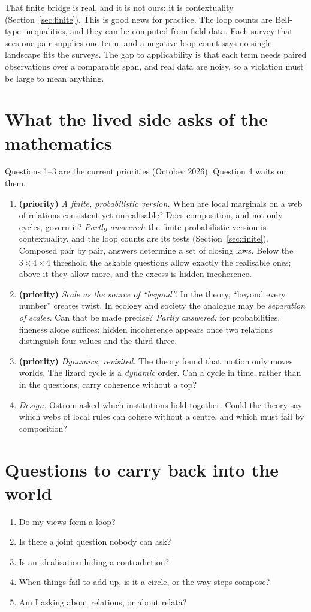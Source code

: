 \documentclass[11pt]{article}
\begin{document}
That finite bridge is real, and it is not ours: it is contextuality
(Section~\ref{sec:finite}). This is good news for practice. The loop counts are
Bell-type inequalities, and they can be computed from field data. Each survey
that sees one pair supplies one term, and a negative loop count says no single
landscape fits the surveys. The gap to applicability is that each term needs
paired observations over a comparable span, and real data are noisy, so a
violation must be large to mean anything.

\section{What the lived side asks of the mathematics}
Questions 1--3 are the current priorities (October 2026). Question 4 waits on
them.
\begin{enumerate}[nosep]
  \item \textbf{(priority)} \emph{A finite, probabilistic version.} When are local marginals on a
    web of relations consistent yet unrealisable? Does composition, and not only
    cycles, govern it? \emph{Partly answered:} the finite probabilistic version is
    contextuality, and the loop counts are its tests (Section~\ref{sec:finite}).
    Composed pair by pair, answers determine a set of closing laws. Below the
    $3\times4\times4$ threshold the askable questions allow exactly the realisable
    ones; above it they allow more, and the excess is hidden incoherence.
  \item \textbf{(priority)} \emph{Scale as the source of ``beyond''.} In the theory, ``beyond every
    number'' creates twist. In ecology and society the analogue may be
    \emph{separation of scales}. Can that be made precise? \emph{Partly answered:}
    for probabilities, fineness alone suffices: hidden incoherence appears once
    two relations distinguish four values and the third three.
  \item \textbf{(priority)} \emph{Dynamics, revisited.} The theory found that motion only moves
    worlds. The lizard cycle is a \emph{dynamic} order. Can a cycle in time,
    rather than in the questions, carry coherence without a top?
  \item \emph{Design.} Ostrom asked which institutions hold together. Could the
    theory say which webs of local rules can cohere without a centre, and which
    must fail by composition?
\end{enumerate}

\section*{Questions to carry back into the world}
\begin{enumerate}[nosep]
  \item Do my views form a loop?
  \item Is there a joint question nobody can ask?
  \item Is an idealisation hiding a contradiction?
  \item When things fail to add up, is it a circle, or the way steps compose?
  \item Am I asking about relations, or about relata?
\end{enumerate}
\end{document}
